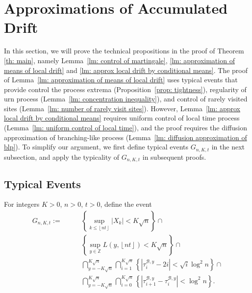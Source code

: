 \documentclass[EJP]{ejpecp} %
\begin{document}
\section{Approximations of Accumulated Drift}\label{sec: approximations}

In this section, we will prove the technical propositions in the proof of Theorem \ref{th: main}, namely Lemma~\ref{lm: control of martingale}, \ref{lm: approximation of means of local drift} and \ref{lm: approx local drift by conditional means}. 
The proof of Lemma~\ref{lm: approximation of means of local drift} uses typical events that provide control the process extrema (Proposition~\ref{prop: tightness}), regularity of urn process (Lemma~\ref{lm: concentration inequality}), and control of rarely visited sites (Lemma~\ref{lm: number of rarely visit sites}). 
However, Lemma~\ref{lm: approx local drift by conditional means} requires uniform control of local time process (Lemma~\ref{lm: uniform control of local time}), and the proof requires the diffusion approximation of branching-like process (Lemma~\ref{lm: diffusion approximation of blp}).
To simplify our argument, we first define typical events $G_{n, K, t}$ in the next subsection, and apply the typicality of $G_{n, K, t}$ in subsequent proofs.

\subsection{Typical Events}

For integers $K>0$, $n > 0$, $t>0$, define the event
\begin{align}
	G_{n,K,t} :=  \qquad
	\label{eq:good-event-1}
	& \left\{\sup _{k \le \left\lfloor nt  \right\rfloor} |X_k| < K \sqrt{n} \right\} \cap \\
	\label{eq:good-event-2}
	& \left\{\sup_{y \in \mathbb{Z}} L(y, \left\lfloor nt  \right\rfloor) < K \sqrt{n} \right\} \cap \\
	\label{eq:good-event-3}
	& \bigcap_{y = - K \sqrt{n} }^{K \sqrt{n}} 
	\bigcap_{i = 1}^{K \sqrt{n} } \left\{\left| \tau_i^{\mathscr{B},y} - 2 i \right| < \sqrt{ i } \log^2 n \right\}  \cap \\
	\label{eq:good-event-4}
	& \bigcap_{y = - K \sqrt{n} }^{K \sqrt{n}} 
	\bigcap_{i = 0}^{K \sqrt{n} } \left\{\left| \tau_{i+1}^{\mathscr{B},y} - \tau_i^{\mathscr{B},y} \right| < \log^2 n \right\}  
	.\end{align}
\end{document}
